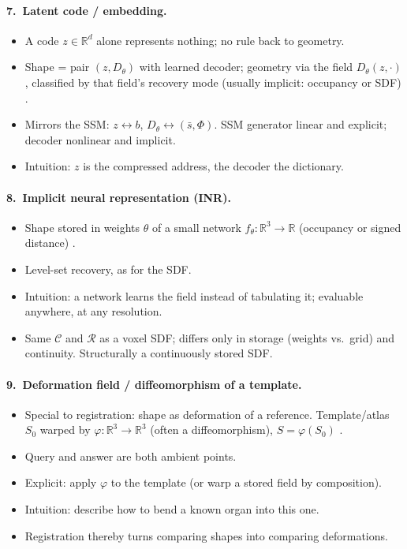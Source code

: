 %
\paragraph{7.~Latent code / embedding.}
\begin{itemize}
    \item A code $z \in \mathbb{R}^d$ alone represents nothing; no rule back to geometry.
    \item Shape = pair $(z, D_\theta)$ with learned decoder; geometry via the field $D_\theta(z,\cdot)$, classified by that field's recovery mode (usually implicit: occupancy or SDF) \citep{park2019deepsdf, mescheder2019occupancy}.
    \item Mirrors the SSM: $z \leftrightarrow b$, $D_\theta \leftrightarrow (\bar{s}, \Phi)$. SSM generator linear and explicit; decoder nonlinear and implicit.
    \item Intuition: $z$ is the compressed address, the decoder the dictionary.
\end{itemize}

%
\paragraph{8.~Implicit neural representation (INR).}
\begin{itemize}
    \item Shape stored in weights $\theta$ of a small network $f_\theta : \mathbb{R}^3 \to \mathbb{R}$ (occupancy or signed distance) \citep{mescheder2019occupancy, park2019deepsdf, sitzmann2020siren}.
    \item Level-set recovery, as for the SDF.
    \item Intuition: a network learns the field instead of tabulating it; evaluable anywhere, at any resolution.
    \item Same $\mathcal{C}$ and $\mathcal{R}$ as a voxel SDF; differs only in storage (weights vs.\ grid) and continuity. Structurally a continuously stored SDF.
\end{itemize}

%
\paragraph{9.~Deformation field / diffeomorphism of a template.}
\begin{itemize}
    \item Special to registration: shape as deformation of a reference. Template/atlas $S_0$ warped by $\varphi : \mathbb{R}^3 \to \mathbb{R}^3$ (often a diffeomorphism), $S = \varphi(S_0)$ \citep{beg2005lddmm, balakrishnan2019voxelmorph}.
    \item Query and answer are both ambient points.
    \item Explicit: apply $\varphi$ to the template (or warp a stored field by composition).
    \item Intuition: describe how to bend a known organ into this one.
    \item Registration thereby turns comparing shapes into comparing deformations.
\end{itemize}

